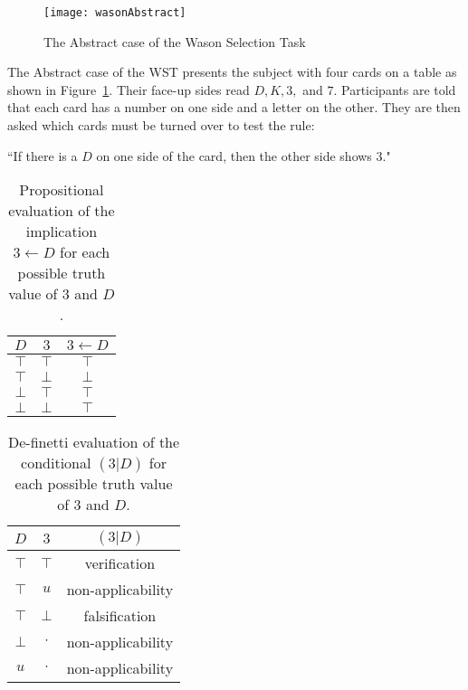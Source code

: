 \begin{figure}
\begin{center}
\texttt{[image: wasonAbstract]}
\caption{The Abstract case of the Wason Selection Task}
\label{fig:wst}
\end{center}

\end{figure}

The Abstract case of the WST presents the subject with four cards on a table as shown in Figure~\ref{fig:wst}. Their face-up sides read $D, K, 3,$ and $7$. Participants are told that each card has a number on one side and a letter on the other. They are then asked which cards must be turned over to test the rule:

\begin{center}
``If there is a $D$ on one side of the card, then the other side shows $3$."
\end{center} 

\begin{table}
\begin{center}


\begin{tabular}{ c c c}
  \textbf{$D$}&  \textbf{$3$}& \textbf{$3\leftarrow D$} \\ 
  \hline
 $\top$ & $\top$ & $\top$\\  
 $\top$ & $\bot$ & $\bot$\\  
 $\bot$ & $\top$ & $\top$\\
 $\bot$ & $\bot$ & $\top$
\end{tabular}
\caption{Propositional evaluation of the implication $3 \leftarrow D$ for each possible truth value of $3$ and $D$.}
\label{tbl:wst_impl}
\end{center}
\end{table}

\begin{table}
\begin{center}


\begin{tabular}{ c c c}
  \textbf{$D$}&  \textbf{$3$}& \textbf{$(3|D)$} \\ 
  \hline
 $\top$ & $\top$ & verification\\  
  $\top$ & $u$ & non-applicability\\ 
 $\top$ & $\bot$ & falsification\\  
 $\bot$ & $\cdot$ & non-applicability\\
 $u$ & $\cdot$ & non-applicability
\end{tabular}
\caption{De-finetti evaluation of the conditional $(3|D)$ for each possible truth value of $3$ and $D$.}
\label{tbl:wst_classical}
\end{center}
\end{table}

